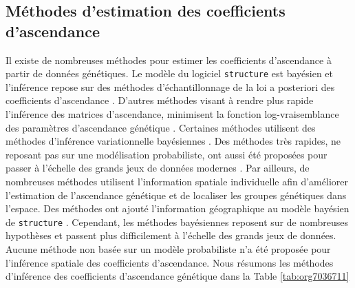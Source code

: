 \documentclass[12pt,a4paper,twoside]{ugathesis}
\begin{document}
\subsection{Méthodes d'estimation des coefficients d'ascendance}
\label{sec:orgfdb2ea4}

Il existe de nombreuses méthodes pour estimer les coefficients d'ascendance à
partir de données génétiques. Le modèle du logiciel \texttt{structure} est bayésien et
l'inférence repose sur des méthodes d'échantillonnage de la loi a posteriori des
coefficients d'ascendance \citep{Pritchard2000}. D'autres méthodes visant à rendre
plus rapide l'inférence des matrices d'ascendance, minimisent la fonction
log-vraisemblance des paramètres d'ascendance génétique
\citep{Tang_2005,alexander2009admixture}. Certaines méthodes utilisent des
méthodes d'inférence variationnelle bayésiennes \citep{Raj_2014}. Des méthodes
très rapides, ne reposant pas sur une modélisation probabiliste, ont aussi été
proposées pour passer à l'échelle des grands jeux de données modernes
\citep{Frichot_2014,Popescu_2014}. Par ailleurs, de nombreuses méthodes utilisent
l'information spatiale individuelle afin d'améliorer l'estimation de
l'ascendance génétique et de localiser les groupes génétiques dans l'espace.
Des méthodes ont ajouté l'information géographique au modèle bayésien de
\texttt{structure} \citep{CHEN_2007,Corander2008,GUEDJ_2011}. Cependant, les méthodes
bayésiennes reposent sur de nombreuses hypothèses et passent plus difficilement
à l'échelle des grands jeux de données. Aucune méthode non basée sur un modèle
probabiliste n'a été proposée pour l'inférence spatiale des coefficients
d'ascendance. Nous résumons les méthodes d'inférence des coefficients
d'ascendance génétique dans la Table \ref{tab:org7036711}
\end{document}
